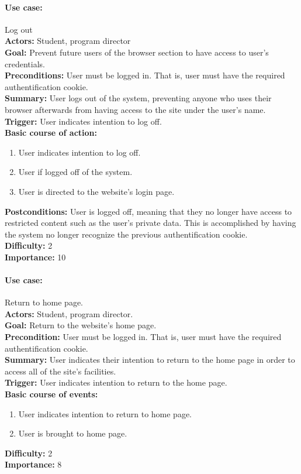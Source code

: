 \documentclass[12pt]{article}
\begin{document}
\paragraph*{Use case:} Log out \\
\textbf{Actors:} Student, program director\\
\textbf{Goal:} Prevent future users of the browser section to have access to user's credentials.\\
\textbf{Preconditions:} User must be logged in. That is, user must have the required authentification cookie.\\
\textbf{Summary:} User logs out of the system, preventing anyone who uses their browser afterwards from having access to the site under the user's name.\\
\textbf{Trigger:} User indicates intention to log off.\\
\textbf{Basic course of action:}
\begin{enumerate}
\item User indicates intention to log off.
\item User if logged off of the system.
\item User is directed to the website's login page.
\end{enumerate}
\textbf{Postconditions:} User is logged off, meaning that they no longer have access to restricted content such as the user's private data. This is accomplished by having the system no longer recognize the previous authentification cookie.\\
\textbf{Difficulty:} 2\\
\textbf{Importance:} 10\\


\paragraph*{Use case:} Return to home page.\\
\textbf{Actors:} Student, program director.\\
\textbf{Goal:} Return to the website's home page.\\
\textbf{Precondition:} User must be logged in. That is, user must have the required authentification cookie.\\
\textbf{Summary:} User indicates their intention to return to the home page in order to access all of the site's facilities.\\
\textbf{Trigger:} User indicates intention to return to the home page.\\
\textbf{Basic course of events:}
\begin{enumerate}
\item User indicates intention to return to home page.
\item User is brought to home page.
\end{enumerate}
\textbf{Difficulty:} 2\\
\textbf{Importance:} 8\\
\end{document}
